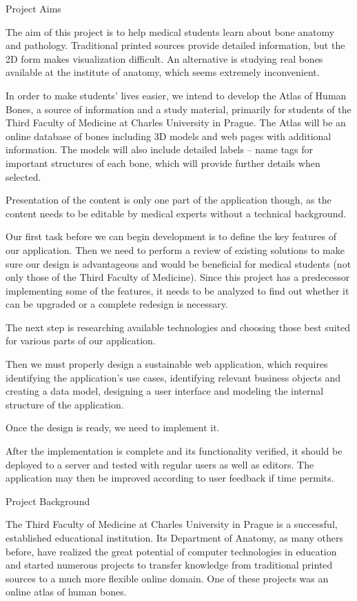 \sec Project Aims

The aim of this project is to help medical students learn about bone anatomy and pathology. Traditional printed sources provide detailed information, but the 2D form makes visualization difficult. An alternative is studying real bones available at the institute of anatomy, which seems extremely inconvenient.

In order to make students’ lives easier, we intend to develop the Atlas of Human Bones, a source of information and a study material, primarily for students of the Third Faculty of Medicine at Charles University in Prague. The Atlas will be an online database of bones including 3D models and web pages with additional information. The models will also include detailed labels -- name tags for important structures of each bone, which will provide further details when selected.

Presentation of the content is only one part of the application though, as the content needs to be editable by medical experts without a technical background.

Our first task before we can begin development is to define the key features of our application. Then we need to perform a review of existing solutions to make sure our design is advantageous and would be beneficial for medical students (not only those of the Third Faculty of Medicine). Since this project has a predecessor implementing some of the features, it needs to be analyzed to find out whether it can be upgraded or a complete redesign is necessary.

The next step is researching available technologies and choosing those best suited for various parts of our application.

Then we must properly design a sustainable web application, which requires identifying the application’s use cases, identifying relevant business objects and creating a data model, designing a user interface and modeling the internal structure of the application.

Once the design is ready, we need to implement it.

After the implementation is complete and its functionality verified, it should be deployed to a server and tested with regular users as well as editors. The application may then be improved according to user feedback if time permits.


\sec Project Background

The Third Faculty of Medicine at Charles University in Prague is a successful, established educational institution. Its Department of Anatomy, as many others before, have realized the great potential of computer technologies in education and started numerous projects to transfer knowledge from traditional printed sources to a much more flexible online domain. One of these projects was an online atlas of human bones.

